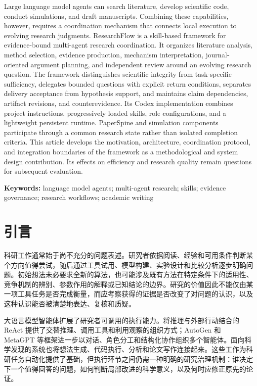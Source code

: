 \documentclass[UTF8,fontset=fandol,a4paper,11pt]{ctexart}
\begin{document}
Large language model agents can search literature, develop scientific code, conduct simulations, and draft manuscripts. Combining these capabilities, however, requires a coordination mechanism that connects local execution to evolving research judgments. ResearchFlow is a skill-based framework for evidence-bound multi-agent research coordination. It organizes literature analysis, method selection, evidence production, mechanism interpretation, journal-oriented argument planning, and independent review around an evolving research question. The framework distinguishes scientific integrity from task-specific sufficiency, delegates bounded questions with explicit return conditions, separates delivery acceptance from hypothesis support, and maintains claim dependencies, artifact revisions, and counterevidence. Its Codex implementation combines project instructions, progressively loaded skills, role configurations, and a lightweight persistent runtime. PaperSpine and simulation components participate through a common research state rather than isolated completion criteria. This article develops the motivation, architecture, coordination protocol, and integration boundaries of the framework as a methodological and system design contribution. Its effects on efficiency and research quality remain questions for subsequent evaluation.

\textbf{Keywords:} language model agents; multi-agent research; skills; evidence governance; research workflows; academic writing

\section{引言}

科研工作通常始于尚不充分的问题表述。研究者依据阅读、经验和可用条件判断某个方向值得尝试，随后通过工具试用、模型构建、实验设计和比较分析逐步明确问题。初始想法未必要求全新的算法，也可能涉及既有方法在特定条件下的适用性、竞争机制的辨别、参数作用的解释或已知结论的边界。研究的价值因此不能仅由某一项工具任务是否完成衡量，而应考察获得的证据是否改变了对问题的认识，以及这种认识能否被清楚地表达、复核和质疑。

大语言模型智能体扩展了研究者可调用的执行能力。将推理与外部行动结合的 ReAct 提供了交替推理、调用工具和利用观察的组织方式\cite{r1}；AutoGen 和 MetaGPT 等框架进一步以对话、角色分工和结构化协作组织多个智能体\cite{r2,r3}。面向科学发现的系统也将想法生成、代码执行、分析和论文写作连接起来\cite{r4}。这些工作为科研任务自动化提供了基础，但执行环节之间仍需一种明确的研究治理机制：谁决定下一个值得回答的问题，如何判断局部改进的科学意义，以及何时应修正原先的论证。
\end{document}
